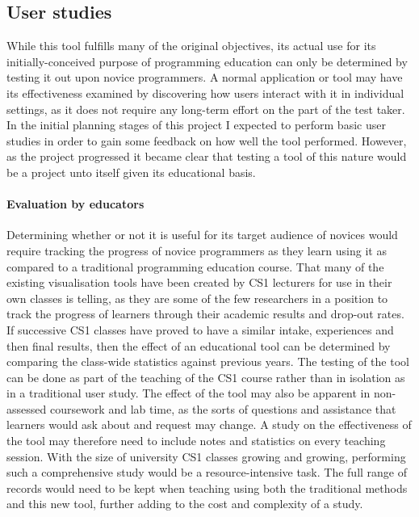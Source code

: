 \subsection{User studies}

While this tool fulfills many of the original objectives, its actual use for its initially-conceived purpose of programming education can only be determined by testing it out upon novice programmers. A normal application or tool may have its effectiveness examined by discovering how users interact with it in individual settings, as it does not require any long-term effort on the part of the test taker. In the initial planning stages of this project I expected to perform basic user studies in order to gain some feedback on how well the tool performed. However, as the project progressed it became clear that testing a tool of this nature would be a project unto itself given its educational basis. 

\paragraph{Evaluation by educators}
Determining whether or not it is useful for its target audience of novices would require tracking the progress of novice programmers as they learn using it as compared to a traditional programming education course. That many of the existing visualisation tools have been created by CS1 lecturers for use in their own classes is telling, as they are some of the few researchers in a position to track the progress of learners through their academic results and drop-out rates. If successive CS1 classes have proved to have a similar intake, experiences and then final results, then the effect of an educational tool can be determined by comparing the class-wide statistics against previous years. The testing of the tool can be done as part of the teaching of the CS1 course rather than in isolation as in a traditional user study. The effect of the tool may also be apparent in non-assessed coursework and lab time, as the sorts of questions and assistance that learners would ask about and request may change. A study on the effectiveness of the tool may therefore need to include notes and statistics on every teaching session. With the size of university CS1 classes growing and growing\cite{nager2016case}, performing such a comprehensive study would be a resource-intensive task. The full range of records would need to be kept when teaching using both the traditional methods and this new tool, further adding to the cost and complexity of a study.

